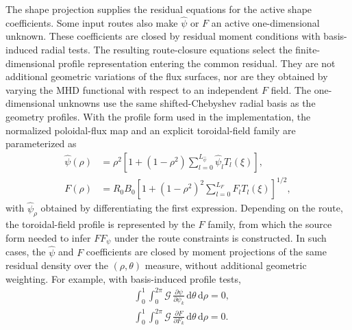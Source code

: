 \documentclass[final, 3p, times]{elsarticle}
\begin{document}
The shape projection supplies the residual equations for the active shape coefficients. Some input routes also make $\hat{\psi}$ or $F$ an active one-dimensional unknown. These coefficients are closed by residual moment conditions with basis-induced radial tests. The resulting route-closure equations select the finite-dimensional profile representation entering the common residual. They are not additional geometric variations of the flux surfaces, nor are they obtained by varying the MHD functional with respect to an independent $F$ field. The one-dimensional unknowns use the same shifted-Chebyshev radial basis as the geometry profiles. With the profile form used in the implementation, the normalized poloidal-flux map and an explicit toroidal-field family are parameterized as
\begin{align}
    \hat{\psi}(\rho)
     & = \rho^2\left[1+(1-\rho^2)\sum_{l=0}^{L_{\hat{\psi}}}\hat{\psi}_l T_l(\xi)\right], \\
    F(\rho)
     & = R_0B_0\left[1+(1-\rho^2)^2\sum_{l=0}^{L_F}F_lT_l(\xi)\right]^{1/2},
\end{align}
with $\hat{\psi}_\rho$ obtained by differentiating the first expression. Depending on the route, the toroidal-field profile is represented by the $F$ family, from which the source form needed to infer $FF_\psi$ under the route constraints is constructed. In such cases, the $\hat{\psi}$ and $F$ coefficients are closed by moment projections of the same residual density over the $(\rho,\theta)$ measure, without additional geometric weighting. For example, with basis-induced profile tests,
\begin{align}
     & \int_0^1\!\int_0^{2\pi}
    \mathcal{G}\,\frac{\partial\psi}{\partial\psi_k}
    \,\mathrm{d}\theta\,\mathrm{d}\rho=0, \\
     & \int_0^1\!\int_0^{2\pi}
    \mathcal{G}\,\frac{\partial F}{\partial F_k}
    \,\mathrm{d}\theta\,\mathrm{d}\rho=0 .
\end{align}
\end{document}
